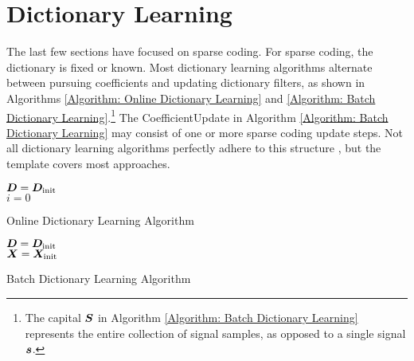 \section{Dictionary Learning}
The last few sections have focused on sparse coding. For sparse coding, the dictionary is fixed or known. Most dictionary learning algorithms alternate between pursuing coefficients and updating dictionary filters, as shown in Algorithms \ref{Algorithm: Online Dictionary Learning} and \ref{Algorithm: Batch Dictionary Learning}.\footnote{The capital $\bm{S}$ in Algorithm \ref{Algorithm: Batch Dictionary Learning} represents the entire collection of signal samples, as opposed to a single signal $\bm{s}$.} The CoefficientUpdate in Algorithm \ref{Algorithm: Batch Dictionary Learning} may consist of one or more sparse coding update steps. Not all dictionary learning algorithms perfectly adhere to this structure \cite{aharon2006k}, but the template covers most approaches.
\begin{algorithm}[h] 
\SetAlgoLined
   $\bm{D} = \bm{D}_{\text{init}}$ \\
   $i = 0$
 \caption{Online Dictionary Learning Algorithm}\label{Algorithm: Online Dictionary Learning}
\end{algorithm}
\begin{algorithm}[h] 
\SetAlgoLined
   $\bm{D} = \bm{D}_{\text{init}}$ \\
   $\bm{X} = \bm{X}_{\text{init}}$ \\
 \caption{Batch Dictionary Learning Algorithm}\label{Algorithm: Batch Dictionary Learning}
\end{algorithm}

